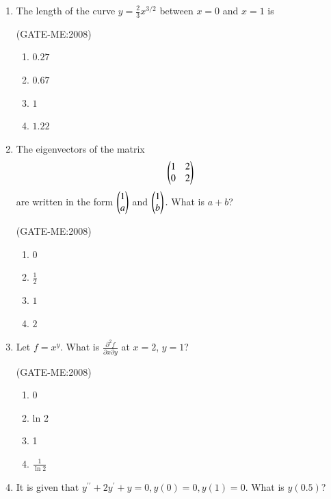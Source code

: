 \documentclass[journal,12pt,onecolumn]{IEEEtran}
\theoremstyle{remark}
\begin{document}
\begin{enumerate}
    \item
        The length of the curve $y = \frac{2}{3}x^{3/2}$ between $x=0$ and $x=1$ is

        \hfill{(GATE-ME:2008)}
        \begin{multicols}{4}
            \begin{enumerate}
                \item $0.27$
                \item $0.67$
                \item $1$
                \item $1.22$
            \end{enumerate}
        \end{multicols}
    
    \item
	The eigenvectors of the matrix \[\begin{pmatrix}1 & 2 \\ 0 & 2\end{pmatrix} \] are written in the form $\begin{pmatrix}1\\a\end{pmatrix}$ and $\begin{pmatrix}1\\b\end{pmatrix}.$ What is $a + b$?

        \hfill{(GATE-ME:2008)}
        \begin{multicols}{4}
            \begin{enumerate}
                \item $0$
                \item $\frac{1}{2}$
                \item $1$
                \item $2$
            \end{enumerate}
        \end{multicols}
                                  
    \item 
	Let $f = x^y$. What is $\frac{\partial^2 f}{\partial x \partial y}$ at $x = 2$, $y = 1$?

	 \hfill{(GATE-ME:2008)}

    \begin{multicols}{4}
        \begin{enumerate}
            \item 0
            \item ln 2
            \item 1
            \item $\frac{1}{\ln 2}$
        \end{enumerate}
    \end{multicols}

    \item 
	    It is given that $y^{\prime \prime} + 2y^\prime + y = 0, y(0) = 0, y(1) = 0$. What is $y(0.5)$?


\end{enumerate}
\end{document}
